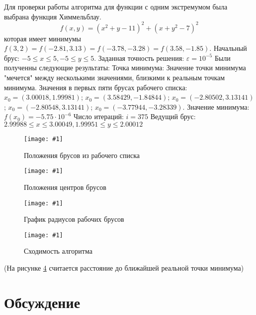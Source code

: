\documentclass[a4paper,12pt]{article}
\newcommand{\plot}[3]{
    \begin{figure}[H]
        \centering
        \texttt{[image: \#1]}
        \caption{#2}
        \label{#3}
    \end{figure}
}
\begin{document}
    \noindent
    Для проверки работы алгоритма для функции  с одним экстремумом была выбрана функция Химмельблау.
    \begin{equation}
        f(x, y) = (x^{2} + y - 11)^{2} + (x + y^{2} - 7)^{2}
    \end{equation}
    которая имеет минимумы $ f(3, 2) = f(-2.81, 3.13) = f(-3.78, -3.28) = f(3.58, -1.85) $.
    Начальный брус: $ -5 \leq x \leq 5, -5 \leq y \leq 5 $. Заданная точность решения: $ \varepsilon = 10^{-5} $
    \newline
    Были полученны следующие результаты:\newline
    Точка минимума: Значение точки минимума "мечется" между несколькими значениями, близкими к реальным точкам минимума.
    Значения в первых пяти брусах рабочего списка:\newline
    $ x_{0} = (3.00018, 1.99981) $;\newline
    $ x_{0} = (3.58429, -1.84844) $;\newline
    $ x_{0} = (-2.80502, 3.13141) $;\newline
    $ x_{0} = (-2.80548, 3.13141) $;\newline
    $ x_{0} = (-3.77944, -3.28339) $.\newline
    Значение минимума: $ f(x_{0}) = -5.75 \cdot 10^{-6} $\newline
    Число итераций: $ i = 375 $\newline
    Ведущий брус: $ 2.99988 \leq x \leq 3.00049, 1.99951 \leq y \leq 2.00012 $
    \plot{HimmelblauFunctionBoxes}{Положения брусов из рабочего списка}{p:HimmelblauBoxes}
    \plot{HimmelblauFunctionCenters}{Положения центров брусов}{p:HimmelblauCenters}
    \plot{HimmelblauFunctionRads}{График радиусов рабочих брусов}{p:HimmelblauRads}
    \plot{HimmelblauFunctionConvergence}{Сходимость алгоритма}{p:HimmelblauConv}
    \noindent(На рисунке \ref{p:HimmelblauConv} считается расстояние до ближайшей реальной точки минимума)

    \section{Обсуждение}
\end{document}
